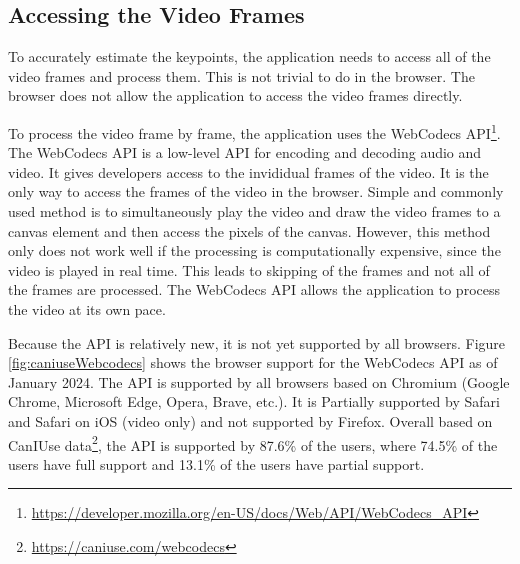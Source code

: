 \subsection{Accessing the Video Frames}

To accurately estimate the keypoints, the application needs to access all of the video frames and process them. This is not trivial to do in the browser. The browser does not allow the application to access the video frames directly.

To process the video frame by frame, the application uses the WebCodecs API\footnote{\url{https://developer.mozilla.org/en-US/docs/Web/API/WebCodecs_API}}. The WebCodecs API is a low-level API for encoding and decoding audio and video. It gives developers access to the invididual frames of the video. It is the only way to access the frames of the video in the browser. Simple and commonly used method is to simultaneously play the video and draw the video  frames to a canvas element and then access the pixels of the canvas. However, this method only does not work well if the processing is computationally expensive, since the video is played in real time. This leads to skipping of the frames and not all of the frames are processed. The WebCodecs API allows the application to process the video at its own pace.

Because the API is relatively new, it is not yet supported by all browsers. Figure \ref{fig:caniuseWebcodecs} shows the browser support for the WebCodecs API as of January 2024. The API is supported by all browsers based on Chromium (Google Chrome, Microsoft Edge, Opera, Brave, etc.). It is Partially supported by Safari and Safari on iOS (video only) and not supported by Firefox. Overall based on CanIUse data\footnote{\url{https://caniuse.com/webcodecs}}, the API is supported by 87.6\% of the users, where 74.5\% of the users have full support and 13.1\% of the users have partial support.


